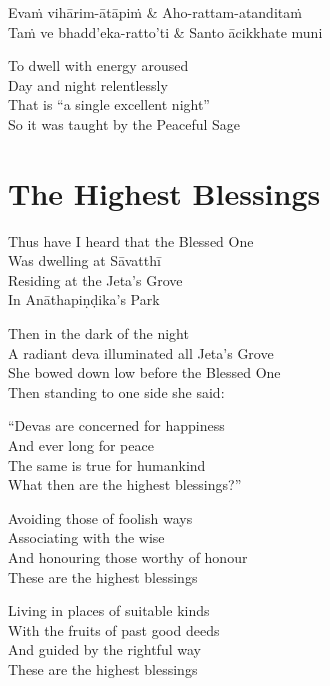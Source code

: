 \begin{twochants}
  Evaṁ vihārim-ātāpiṁ & Aho-rattam-atanditaṁ\\
  Taṁ ve bhadd’eka-ratto’ti & Santo ācikkhate muni\\
\end{twochants}

\begin{english}
  To dwell with energy aroused\\
  Day and night relentlessly\\
  That is “a single excellent night”\\
  So it was taught by the Peaceful Sage
\end{english}


\clearpage

\section{The Highest Blessings}

\begin{leader}
\end{leader}

Thus have I heard that the Blessed One\\
Was dwelling at Sāvatthī\\
Residing at the Jeta’s Grove\\
In Anāthapiṇḍika’s Park

Then in the dark of the night\\
A radiant deva illuminated all Jeta’s Grove\\
She bowed down low before the Blessed One\\
Then standing to one side she said:

“Devas are concerned for happiness\\
And ever long for peace\\
The same is true for humankind\\
What then are the highest blessings?”

Avoiding those of foolish ways\\
Associating with the wise\\
And honouring those worthy of honour\\
These are the highest blessings

Living in places of suitable kinds\\
With the fruits of past good deeds\\
And guided by the rightful way\\
These are the highest blessings

